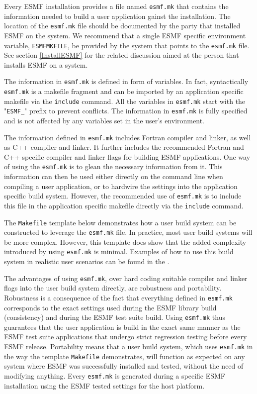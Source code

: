 Every ESMF installation provides a file named {\tt esmf.mk} that contains the 
information needed to build a user application gainst the installation. The
location of the {\tt esmf.mk} file should be documented by the party that
installed ESMF on the system. We recommend that a single ESMF specific 
environment variable, {\tt ESMFMKFILE}, be provided by the system that points to 
the {\tt esmf.mk} file. See section \ref{InstallESMF} for the related discussion 
aimed at the person that installs ESMF on a system.

The information in {\tt esmf.mk} is defined in form of variables. In fact, 
syntactically {\tt esmf.mk} is a makefile fragment and can be imported by an 
application specific makefile via the {\tt include} command. All the variables 
in {\tt esmf.mk} start with the "{\tt ESMF\_}" prefix to prevent conflicts. The 
information in {\tt esmf.mk} is fully specified and is not affected by any 
variables set in the user's environment.

The information defined in {\tt esmf.mk} includes Fortran compiler and linker, 
as well as C++ compiler and linker. It further includes the recommended Fortran 
and C++ specific compiler and linker flags for building ESMF applications. One 
way of using the {\tt esmf.mk} is to glean the necessary information from it. 
This information can then be used either directly on the command line when 
compiling a user application, or to hardwire the settings into the application 
specific build system. However, the recommended use of {\tt esmf.mk} is to 
include this file in the application specific makefile directly via the 
{\tt include} command.

The {\tt Makefile} template below demonstrates how a user build system can be 
constructed to leverage the {\tt esmf.mk} file. In practice, most user build 
systems will be more complex. However, this template does show that the added 
complexity introduced by using {\tt esmf.mk} is minimal. Examples of how to use 
this build system in realistic user scenarios can be found in the 
.

The advantages of using {\tt esmf.mk}, over hard coding suitable compiler and 
linker flags into the user build system directly, are robustness and portability. 
Robustness is a consequence of the fact that everything defined in {\tt esmf.mk} 
corresponds to the exact settings used during the ESMF library build 
(consistency) and during the ESMF test suite build. Using {\tt esmf.mk} thus 
guarantees that the user application is build in the exact same manner as the 
ESMF test suite applications that undergo strict regression testing before every 
ESMF release. Portability means that a user build system, which uses 
{\tt esmf.mk} in the way the template {\tt Makefile} demonstrates, will function 
as expected on any system where ESMF was successfully installed and tested, 
without the need of modifying anything. Every {\tt esmf.mk} is generated during 
a specific ESMF installation using the ESMF tested settings for the host 
platform.

